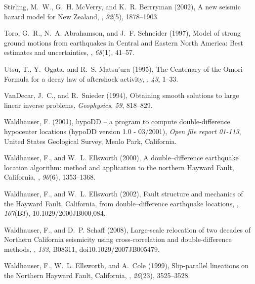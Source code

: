 \documentclass[12pt,double]{article}
\begin{document}
\begin{thebibliography}{45}
Stirling, M.~W., G.~H. Mc{V}erry, and K.~R. Berrryman (2002), A new seismic
  hazard model for {N}ew {Z}ealand, \bssa, \textit{92}(5), 1878--1903.

Toro, G.~R., N.~A. Abrahamson, and J.~F. Schneider (1997), Model of strong
  ground motions from earthquakes in {C}entral and {E}astern {N}orth {A}merica:
  {B}est estimates and uncertainties, \srl,
  \textit{68}(1), 41--57.

Utsu, T., Y.~Ogata, and R.~S. Matsu'ura (1995), The {C}entenary of the {O}mori
  {F}ormula for a decay law of aftershock activity, \jpe, \textit{43}, 1--33.

Van{D}ecar, J.~C., and R.~Snieder (1994), Obtaining smooth solutions to large
  linear inverse problems, \textit{Geophysics}, \textit{59}, 818--829.

Waldhauser, F. (2001), hypo{DD} -- a program to compute double-difference
  hypocenter locations (hypo{DD} version 1.0 - 03/2001), \textit{Open file
  report 01-113}, United States Geological Survey, Menlo Park, California.

Waldhauser, F., and W.~L. Ellsworth (2000), A double--difference earthquake
  location algorithm: method and application to the northern {H}ayward {F}ault,
  {C}alifornia, \bssa,
  \textit{90}(6), 1353--1368.

Waldhauser, F., and W.~L. Ellsworth (2002), Fault structure and mechanics of
  the {H}ayward {F}ault, {C}alifornia, from double--difference earthquake
  locations, \jgr, \textit{107}(B3),
  10.1029/2000JB000,084.

Waldhauser, F., and D.~P. Schaff (2008), Large-scale relocation of two decades
  of {N}orthern {C}alifornia seismicity using cross-correlation and
  double-difference methods, \jgr,
  \textit{133}, {B08311, doi10.1029/2007JB005479}.

Waldhauser, F., W.~L. Ellsworth, and A.~Cole (1999), Slip-parallel lineations
  on the {N}orthern {H}ayward {F}ault, {C}alifornia, \grl, \textit{26}(23), 3525--3528.

\end{thebibliography}
\end{document}

